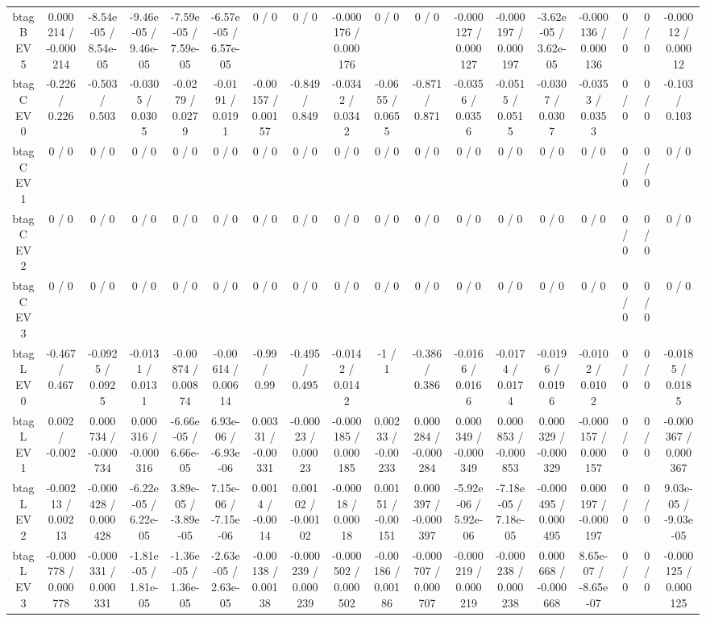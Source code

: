 \documentclass[10pt]{article}
\begin{document}
\begin{table}[htbp]
\begin{center}
\begin{tabular}{|c|c|c|c|c|c|c|c|c|c|c|c|c|c|c|c|c|c|}
  btag B EV 5 & 0.000214 / -0.000214 & -8.54e-05 / 8.54e-05 & -9.46e-05 / 9.46e-05 & -7.59e-05 / 7.59e-05 & -6.57e-05 / 6.57e-05 & 0 / 0 & 0 / 0 & -0.000176 / 0.000176 & 0 / 0 & 0 / 0 & -0.000127 / 0.000127 & -0.000197 / 0.000197 & -3.62e-05 / 3.62e-05 & -0.000136 / 0.000136 & 0 / 0 & 0 / 0 & -0.00012 / 0.00012 \\ 
  btag C EV 0 & -0.226 / 0.226 & -0.503 / 0.503 & -0.0305 / 0.0305 & -0.0279 / 0.0279 & -0.0191 / 0.0191 & -0.00157 / 0.00157 & -0.849 / 0.849 & -0.0342 / 0.0342 & -0.0655 / 0.0655 & -0.871 / 0.871 & -0.0356 / 0.0356 & -0.0515 / 0.0515 & -0.0307 / 0.0307 & -0.0353 / 0.0353 & 0 / 0 & 0 / 0 & -0.103 / 0.103 \\ 
  btag C EV 1 & 0 / 0 & 0 / 0 & 0 / 0 & 0 / 0 & 0 / 0 & 0 / 0 & 0 / 0 & 0 / 0 & 0 / 0 & 0 / 0 & 0 / 0 & 0 / 0 & 0 / 0 & 0 / 0 & 0 / 0 & 0 / 0 & 0 / 0 \\ 
  btag C EV 2 & 0 / 0 & 0 / 0 & 0 / 0 & 0 / 0 & 0 / 0 & 0 / 0 & 0 / 0 & 0 / 0 & 0 / 0 & 0 / 0 & 0 / 0 & 0 / 0 & 0 / 0 & 0 / 0 & 0 / 0 & 0 / 0 & 0 / 0 \\ 
  btag C EV 3 & 0 / 0 & 0 / 0 & 0 / 0 & 0 / 0 & 0 / 0 & 0 / 0 & 0 / 0 & 0 / 0 & 0 / 0 & 0 / 0 & 0 / 0 & 0 / 0 & 0 / 0 & 0 / 0 & 0 / 0 & 0 / 0 & 0 / 0 \\ 
  btag L EV 0 & -0.467 / 0.467 & -0.0925 / 0.0925 & -0.0131 / 0.0131 & -0.00874 / 0.00874 & -0.00614 / 0.00614 & -0.99 / 0.99 & -0.495 / 0.495 & -0.0142 / 0.0142 & -1 / 1 & -0.386 / 0.386 & -0.0166 / 0.0166 & -0.0174 / 0.0174 & -0.0196 / 0.0196 & -0.0102 / 0.0102 & 0 / 0 & 0 / 0 & -0.0185 / 0.0185 \\ 
  btag L EV 1 & 0.002 / -0.002 & 0.000734 / -0.000734 & 0.000316 / -0.000316 & -6.66e-05 / 6.66e-05 & 6.93e-06 / -6.93e-06 & 0.00331 / -0.00331 & -0.00023 / 0.00023 & -0.000185 / 0.000185 & 0.00233 / -0.00233 & 0.000284 / -0.000284 & 0.000349 / -0.000349 & 0.000853 / -0.000853 & 0.000329 / -0.000329 & -0.000157 / 0.000157 & 0 / 0 & 0 / 0 & -0.000367 / 0.000367 \\ 
  btag L EV 2 & -0.00213 / 0.00213 & -0.000428 / 0.000428 & -6.22e-05 / 6.22e-05 & 3.89e-05 / -3.89e-05 & 7.15e-06 / -7.15e-06 & 0.0014 / -0.0014 & 0.00102 / -0.00102 & -0.00018 / 0.00018 & 0.00151 / -0.00151 & 0.000397 / -0.000397 & -5.92e-06 / 5.92e-06 & -7.18e-05 / 7.18e-05 & -0.000495 / 0.000495 & 0.000197 / -0.000197 & 0 / 0 & 0 / 0 & 9.03e-05 / -9.03e-05 \\ 
  btag L EV 3 & -0.000778 / 0.000778 & -0.000331 / 0.000331 & -1.81e-05 / 1.81e-05 & -1.36e-05 / 1.36e-05 & -2.63e-05 / 2.63e-05 & -0.00138 / 0.00138 & -0.000239 / 0.000239 & -0.000502 / 0.000502 & -0.00186 / 0.00186 & -0.000707 / 0.000707 & -0.000219 / 0.000219 & -0.000238 / 0.000238 & 0.000668 / -0.000668 & 8.65e-07 / -8.65e-07 & 0 / 0 & 0 / 0 & -0.000125 / 0.000125 \\ 

\end{tabular}
\end{center}
\end{table}
\end{document}

